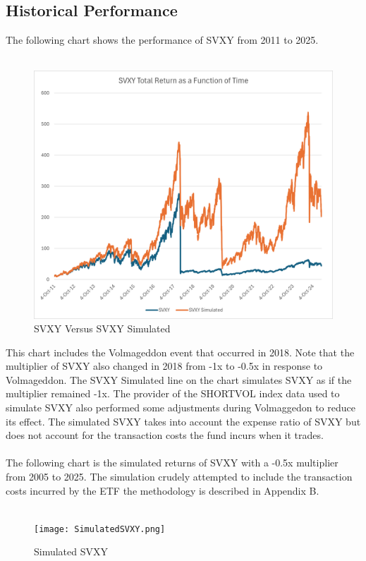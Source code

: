 \documentclass[11pt, oneside]{book}
\begin{document}
\subsection{Historical Performance} \label{Investing-PurchETF-Historical}
The following chart shows the performance of SVXY from 2011 to 2025.\\
\\
\begin{figure}[H]
\centering
\includegraphics[width=\textwidth]{SVXY.png}
\caption{SVXY Versus SVXY Simulated} \label{Fig-SVXYVersusSIMSVXY}
\end{figure}
\noindent
This chart includes the Volmageddon event that occurred in 2018. Note that the multiplier of SVXY also changed in 2018 from -1x to -0.5x in response to Volmageddon. The SVXY Simulated line on the chart simulates SVXY as if the multiplier remained -1x. The provider of the SHORTVOL index data used to simulate SVXY also performed some adjustments during Volmaggedon to reduce its effect. The simulated SVXY takes into account the expense ratio of SVXY but does not account for the transaction costs the fund incurs when it trades.\\
\\
The following chart is the simulated returns of SVXY with a -0.5x multiplier from 2005 to 2025. The simulation crudely attempted to include the transaction costs incurred by the ETF the methodology is described in Appendix B.\\
\\
\begin{figure}[H]
\centering
\texttt{[image: SimulatedSVXY.png]}
\caption{Simulated SVXY} \label{Fig-SimSVXY}
\end{figure}
\end{document}
